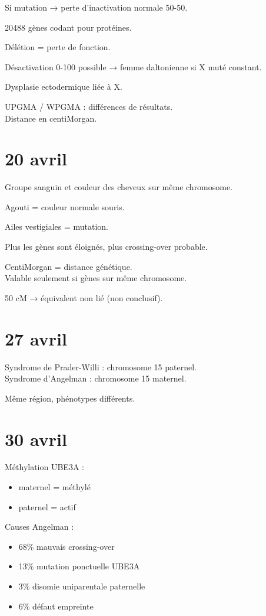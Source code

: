 \documentclass[11pt]{article}
\begin{document}
Si mutation → perte d'inactivation normale 50-50.

20488 gènes codant pour protéines.

Délétion = perte de fonction.

Désactivation 0-100 possible → femme daltonienne si X muté constant.

Dysplasie ectodermique liée à X.

\vspace{0.3cm}

UPGMA / WPGMA : différences de résultats.\\
Distance en centiMorgan.

\section*{20 avril}

Groupe sanguin et couleur des cheveux sur même chromosome.

Agouti = couleur normale souris.

Ailes vestigiales = mutation.

Plus les gènes sont éloignés, plus crossing-over probable.

CentiMorgan = distance génétique.\\
Valable seulement si gènes sur même chromosome.

50 cM → équivalent non lié (non conclusif).

\section*{27 avril}

Syndrome de Prader-Willi : chromosome 15 paternel.\\
Syndrome d'Angelman : chromosome 15 maternel.

Même région, phénotypes différents.

\section*{30 avril}

Méthylation UBE3A :
\begin{itemize}
    \item maternel = méthylé
    \item paternel = actif
\end{itemize}

Causes Angelman :
\begin{itemize}
    \item 68\% mauvais crossing-over
    \item 13\% mutation ponctuelle UBE3A
    \item 3\% disomie uniparentale paternelle
    \item 6\% défaut empreinte
\end{itemize}
\end{document}
